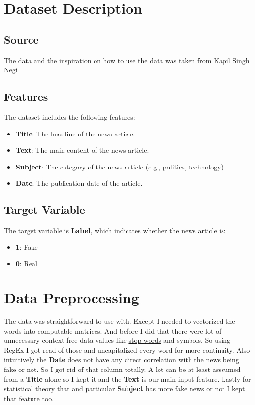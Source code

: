 \documentclass[12pt]{article}
\begin{document}
\section{Dataset Description}
\subsection{Source}
The data and the inspiration on how to use the data was taken from 
\href{www.github.com/kapilsinghnegi}{Kapil Singh Negi}

\subsection{Features}
The dataset includes the following features:  
\begin{itemize}
    \item \textbf{Title}: The headline of the news article.  
    \item \textbf{Text}: The main content of the news article.  
    \item \textbf{Subject}: The category of the news article (e.g., politics, technology).  
    \item \textbf{Date}: The publication date of the article.
\end{itemize}

\subsection{Target Variable}
The target variable is \textbf{Label}, which indicates whether the news article is:  
\begin{itemize}
    \item \textbf{1}: Fake
    \item \textbf{0}: Real
\end{itemize}

\section{Data Preprocessing}
The data was straightforward to use with. Except I needed to vectorized the words into computable matrices. And before I did that there were lot of unnecessary context free data values like \href{https://productresources.collibra.com/docs/collibra/latest/Content/Settings/ServicesConfiguration/co_stop-words.htm}{stop words} and symbols. So using RegEx I got read of those and uncapitalized every word for more continuity.
\newline
\newline
Also intuitively the \textbf{Date} does not have any direct correlation with the news being fake or not. So I got rid of that column totally. A lot can be at least asssumed from a \textbf{Title} alone so I kept it and the \textbf{Text} is our main input feature. Lastly for statistical theory that and particular \textbf{Subject} has more fake news or not I kept that feature too.
\end{document}
